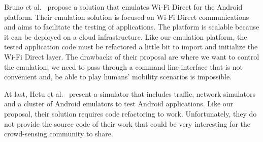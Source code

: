 Bruno et al.~\cite{DBLP:journals/amsys/Bruno0F15} propose a solution that emulates Wi-Fi Direct for the Android platform.
Their emulation solution is focused on Wi-Fi Direct communications and aims to facilitate the testing of applications.
The platform is scalable because it can be deployed on a cloud infrastructure.
Like our emulation platform, the tested application code must be refactored a little bit to import and initialize the Wi-Fi Direct layer.
The drawbacks of their proposal are where we want to control the emulation, we need to pass through a command line interface that is not convenient and, be able to play humans' mobility scenarios is impossible.

At last, Hetu et al.~\cite{DBLP:conf/vtc/HetuHP14} present a simulator that includes traffic, network simulators and a cluster of Android emulators to test Android applications.
Like our proposal, their solution requires code refactoring to work.
Unfortunately, they do not provide the source code of their work that could be very interesting for the crowd-sensing community to share.

